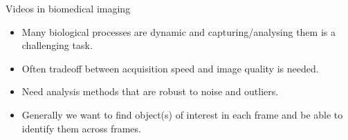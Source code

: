 \documentclass[9pt, aspectratio=169]{beamer}
\begin{document}
\begin{frame}
\end{frame}

\begin{frame}
    {Videos in biomedical imaging}
    \begin{itemize}
        \item Many biological processes are dynamic and capturing/analysing them is a challenging task.
        \item Often tradeoff between acquisition speed and image quality is needed.
        \item Need analysis methods that are robust to noise and outliers.
        \item Generally we want to find object(s) of interest in each frame and be able to identify them across frames.
    \end{itemize}
\end{frame}
\end{document}
